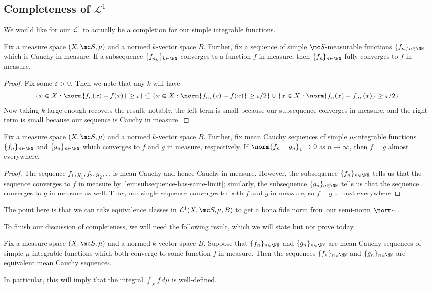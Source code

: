\documentclass[../notes.tex]{subfiles}
\begin{document}
\subsection{Completeness of \texorpdfstring{$\mathcal L^1$}{ L1}}
We would like for our $\mathcal L^1$ to actually be a completion for our simple integrable functions.
\begin{lemma} \label{lem:subsequence-has-same-limit}
	Fix a measure space $(X,\mc S,\mu)$ and a normed $k$-vector space $B$. Further, fix a sequence of simple $\mc S$-measurable functions $\{f_n\}_{n\in\NN}$ which is Cauchy in measure. If a subsequence $\{f_{n_k}\}_{k\in\NN}$ converges to a function $f$ in measure, then $\{f_n\}_{n\in\NN}$ fully converges to $f$ in measure.
\end{lemma}
\begin{proof}
	Fix some $\varepsilon>0$. Then we note that any $k$ will have
	\[\{x\in X:\norm{f_n(x)-f(x)}\ge\varepsilon\}\subseteq\{x\in X:\norm{f_{n_k}(x)-f(x)}\ge\varepsilon/2\}\cup\{x\in X:\norm{f_n(x)-f_{n_k}(x)}\ge\varepsilon/2\}.\]
	Now taking $k$ large enough recovers the result; notably, the left term is small because our subsequence converges in measure, and the right term is small because our sequence is Cauchy in measure.
\end{proof}
\begin{lemma}
	Fix a measure space $(X,\mc S,\mu)$ and a normed $k$-vector space $B$. Further, fix mean Cauchy sequences of simple $\mu$-integrable functions $\{f_n\}_{n\in\NN}$ and $\{g_n\}_{n\in\NN}$ which converges to $f$ and $g$ in measure, respectively. If $\norm{f_n-g_n}_1\to0$ as $n\to\infty$, then $f=g$ almost everywhere.
\end{lemma}
\begin{proof}
	The sequence $f_1,g_1,f_2,g_2,\ldots$ is mean Cauchy and hence Cauchy in measure. However, the subsequence $\{f_n\}_{n\in\NN}$ tells us that the sequence converges to $f$ in measure by \autoref{lem:subsequence-has-same-limit}; similarly, the subsequence $\{g_n\}_{n\in\NN}$ tells us that the sequence converges to $g$ in measure as well. Thus, our single sequence converges to both $f$ and $g$ in measure, so $f=g$ almost everywhere
\end{proof}
The point here is that we can take equivalence classes in $\mathcal L^1(X,\mc S,\mu,B)$ to get a bona fide norm from our semi-norm $\norm\cdot_1$.

To finish our discussion of completeness, we will need the following result, which we will state but not prove today.
\begin{proposition}
	Fix a measure space $(X,\mc S,\mu)$ and a normed $k$-vector space $B$. Suppose that $\{f_n\}_{n\in\NN}$ and $\{g_n\}_{n\in\NN}$ are mean Cauchy sequences of simple $\mu$-integrable functions which both converge to some function $f$ in measure. Then the sequences $\{f_n\}_{n\in\NN}$ and $\{g_n\}_{n\in\NN}$ are equivalent mean Cauchy sequences.
\end{proposition}
In particular, this will imply that the integral $\int_Xf\,d\mu$ is well-defined.
\end{document}
